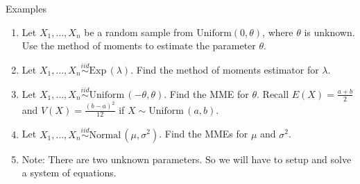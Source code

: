 \documentclass{article}
\newcommand{\vecn}[2]{#1_1, \ldots, #1_{#2}}	%
\newcommand{\follow}[1]{\sim \text{#1}\,}		%
\newcommand{\followsp}[2]{\overset{#1}\sim \text{#2}\,}		%
\begin{document}
Examples\bigskip
\begin{enumerate}
    \item Let $\vecn{X}{n}$ be a random sample from $\text{Uniform}(0, \theta)$, where $\theta$ is unknown. Use the method of moments to estimate the parameter $\theta$.\vspace{60pt}
    \item Let $\vecn{X}{n} \followsp{iid}{Exp}(\lambda)$. Find the method of moments estimator for $\lambda$.\vspace{60pt}
    \item Let $\vecn{X}{n} \followsp{iid}{Uniform}(-\theta, \theta)$. Find the MME for $\theta$. Recall $E(X) = \frac{a + b}{2}$ and $V(X) = \frac{(b - a)^2}{12}$ if $X \follow{Uniform}(a, b)$.\vspace{130pt}
    \item Let $\vecn{X}{n} \followsp{iid}{Normal}(\mu, \sigma^2)$. Find the MMEs for $\mu$ and $\sigma^2$.
    \item[] Note: There are two unknown parameters. So we will have to setup and solve a system of equations.\vspace{160pt}
\end{enumerate}\bigskip
\end{document}
